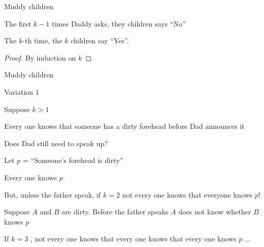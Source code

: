 \begin{frame}{Muddy children}
\begin{theorem}
\BI
\item The first $k-1$ times Daddy asks, they children says “No”
\item The $k$-th time, the $k$ children say “Yes”.
\EI
\end{theorem}

\begin{proof}
By induction on $k$
\end{proof}



\end{frame}

\begin{frame}{Muddy children}
\begin{block}{Variation 1}
\BI
\item Suppose $k>1$
\item Every one knows that someone has a dirty forehead before Dad announces it
\item Does Dad still need to speak up?
\EI
\end{block}

\pause
\BI
\item Let $p$ = “Someone’s forehead is dirty” 
\item Every one knows $p$
\item But, unless the father speak, if $k = 2$ not every one knows that everyone knows $p$!
\item Suppose $A$ and $B$ are dirty. Before the father speaks $A$ does not know whether $B$ knows $p$
\item If $k = 3$ , not every one knows that every one knows that every one knows $p$ ...
\EI


\end{frame}

